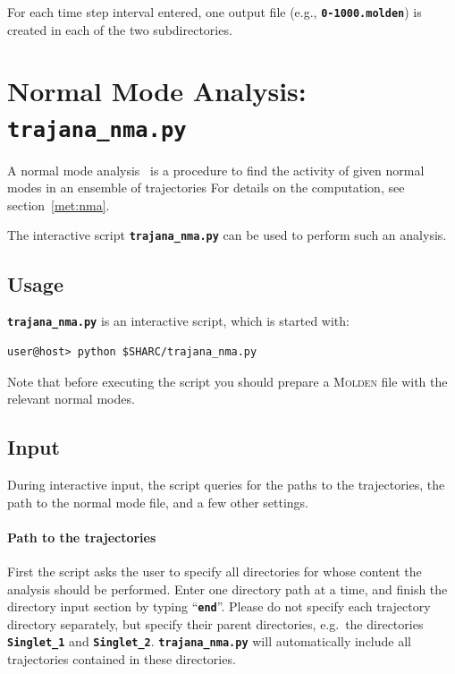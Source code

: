 \documentclass[a4paper,10pt,DIV=15,openany,twoside=false]{scrbook}
\newcommand{\ttt}[1]{\textbf{\texttt{#1}}}
\begin{document}
For each time step interval entered, one output file (e.g., \ttt{0-1000.molden}) is created in each of the two subdirectories.





\section{Normal Mode Analysis: \ttt{trajana\_nma.py}}\label{sec:trajana_nma.py}

A normal mode analysis~\cite{Kurtz2001JCP} is a procedure to find the activity of given normal modes in an ensemble of trajectories
For details on the computation, see section~\ref{met:nma}.

The interactive script \ttt{trajana\_nma.py} can be used to perform such an analysis.

\subsection{Usage}

\ttt{trajana\_nma.py} is an interactive script, which is started with:
\begin{verbatim}
user@host> python $SHARC/trajana_nma.py
\end{verbatim}
Note that before executing the script you should prepare a \textsc{Molden} file with the relevant normal modes.

\subsection{Input}

During interactive input, the script queries for the paths to the trajectories, the path to the normal mode file, and a few other settings.

\paragraph{Path to the trajectories}

First the script asks the user to specify all directories for whose content the analysis should be performed. Enter one directory path at a time, and finish the directory input section by typing ``\ttt{end}''. Please do not specify each trajectory directory separately, but specify their parent directories, e.g.\ the directories \ttt{Singlet\_1} and \ttt{Singlet\_2}. \ttt{trajana\_nma.py} will automatically include all trajectories contained in these directories.
\end{document}
